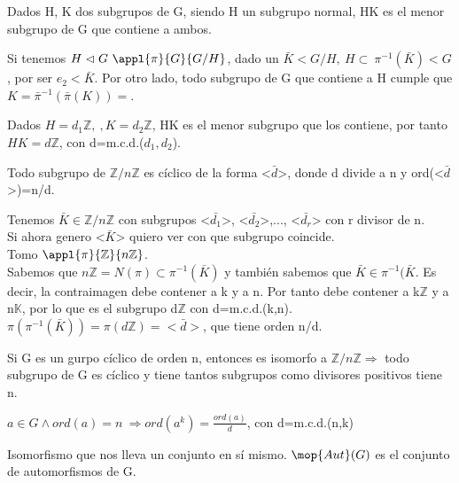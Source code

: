 \documentclass[nochap]{apuntes}
\begin{document}
\begin{defn}
Dados H, K dos subgrupos de G, siendo H un subgrupo normal, HK es el menor subgrupo de G que contiene a ambos.
\end{defn}

 Si tenemos $H \vartriangleleft G \ \appl{\pi}{G}{G/H}$, dado un $\bar{K} < G/H, \  H \subset \ \pi^{-1}(\bar{K}) < G $, por ser $e_2 < \bar{K}$. Por otro lado, todo subgrupo de G que contiene a H cumple que $K=\bar{\pi}^{-1}(\bar{\pi}(K))=$.
 
 \begin{example}
  Dados $H=d_1\mathbb{Z}, \ , K=d_2\mathbb{Z}$, HK es el menor subgrupo que los contiene, por tanto $HK=d\mathbb{Z}$, con d=m.c.d.($d_1, d_2$).
 \end{example}

 \begin{theorem}
  Todo subgrupo de $\mathbb{Z}/n\mathbb{Z}$  es cíclico de la forma <$\bar{d}$>, donde d divide a n y ord(<$\bar{d}$>)=n/d.
 \end{theorem}
\begin{example}
 Tenemos $\bar{K}\in \mathbb{Z}/n\mathbb{Z}$  con subgrupos <$\bar{d_1}$>, <$\bar{d_2}$>,..., <$\bar{d_r}$> con r divisor de n.\\
 Si ahora genero <$\bar{K}$> quiero ver con que subgrupo coincide.\\
 Tomo $\appl{\pi}{\mathbb{Z}}{n\mathbb{Z}}$.\\
 Sabemos que $n\mathbb{Z}=N(\pi) \subset \pi^{-1}(\bar{K})$  y también sabemos que $\bar{K} \in \pi^{-1}(\bar{K}$. Es decir,
 la contraimagen debe contener a k y a n. Por tanto debe contener a k$\mathbb{Z}$  y a n$\mathbb{K}$, por lo que es el subgrupo
 d$\mathbb{Z}$  con d=m.c.d.(k,n).\\
 $\pi(\pi^{-1}(\bar{K}))=\pi(d\mathbb{Z})=<\bar{d}>$, que tiene orden n/d.
\end{example}

Si G es un gurpo cíclico de orden n, entonces es isomorfo a $\mathbb{Z}/n\mathbb{Z} \Rightarrow$  todo subgrupo de G es cíclico y 
tiene tantos subgrupos como divisores positivos tiene n.

\begin{theorem}
 $a\in G \wedge ord(a)=n \ \Rightarrow ord(a^{k})=\frac{ord(a)}{d}$, con d=m.c.d.(n,k)
\end{theorem}

\begin{defn}[Automorfismo]\label{defAutomorfismo}
 Isomorfismo que nos lleva un conjunto en sí mismo. $\mop{Aut}(G)$ es el conjunto de automorfismos de G.
\end{defn}
\end{document}
